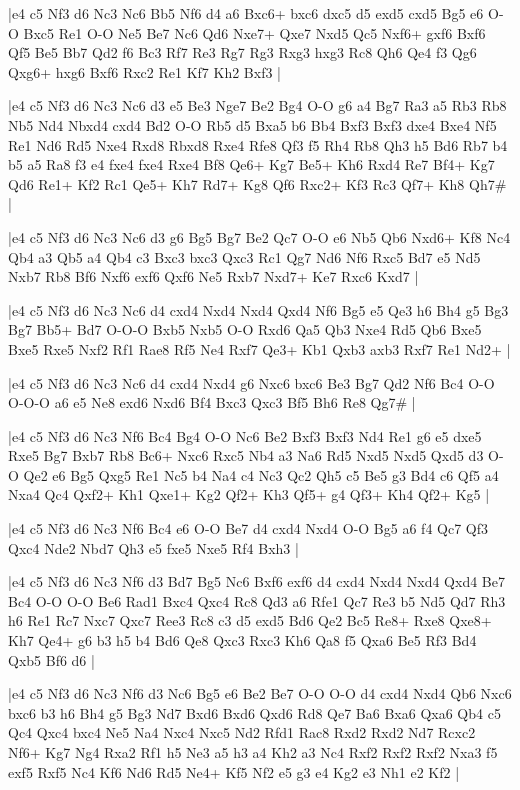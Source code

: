 \whitename{}
\blackname{}
\makegametitle
|e4 c5 Nf3 d6 Nc3 Nc6 Bb5 Nf6 d4 a6 Bxc6+ bxc6 dxc5 d5 exd5 cxd5 Bg5 e6 O-O Bxc5 Re1 O-O Ne5 Be7 Nc6 Qd6 Nxe7+ Qxe7 Nxd5 Qc5 Nxf6+ gxf6 Bxf6 Qf5 Be5 Bb7 Qd2 f6 Bc3 Rf7 Re3 Rg7 Rg3 Rxg3 hxg3 Rc8 Qh6 Qe4 f3 Qg6 Qxg6+ hxg6 Bxf6 Rxc2 Re1 Kf7 Kh2 Bxf3  |

\whitename{}
\blackname{}
\makegametitle
|e4 c5 Nf3 d6 Nc3 Nc6 d3 e5 Be3 Nge7 Be2 Bg4 O-O g6 a4 Bg7 Ra3 a5 Rb3 Rb8 Nb5 Nd4 Nbxd4 cxd4 Bd2 O-O Rb5 d5 Bxa5 b6 Bb4 Bxf3 Bxf3 dxe4 Bxe4 Nf5 Re1 Nd6 Rd5 Nxe4 Rxd8 Rbxd8 Rxe4 Rfe8 Qf3 f5 Rh4 Rb8 Qh3 h5 Bd6 Rb7 b4 b5 a5 Ra8 f3 e4 fxe4 fxe4 Rxe4 Bf8 Qe6+ Kg7 Be5+ Kh6 Rxd4 Re7 Bf4+ Kg7 Qd6 Re1+ Kf2 Rc1 Qe5+ Kh7 Rd7+ Kg8 Qf6 Rxc2+ Kf3 Rc3 Qf7+ Kh8 Qh7\#  |

\whitename{}
\blackname{}
\makegametitle
|e4 c5 Nf3 d6 Nc3 Nc6 d3 g6 Bg5 Bg7 Be2 Qc7 O-O e6 Nb5 Qb6 Nxd6+ Kf8 Nc4 Qb4 a3 Qb5 a4 Qb4 c3 Bxc3 bxc3 Qxc3 Rc1 Qg7 Nd6 Nf6 Rxc5 Bd7 e5 Nd5 Nxb7 Rb8 Bf6 Nxf6 exf6 Qxf6 Ne5 Rxb7 Nxd7+ Ke7 Rxc6 Kxd7  |

\whitename{}
\blackname{}
\makegametitle
|e4 c5 Nf3 d6 Nc3 Nc6 d4 cxd4 Nxd4 Nxd4 Qxd4 Nf6 Bg5 e5 Qe3 h6 Bh4 g5 Bg3 Bg7 Bb5+ Bd7 O-O-O Bxb5 Nxb5 O-O Rxd6 Qa5 Qb3 Nxe4 Rd5 Qb6 Bxe5 Bxe5 Rxe5 Nxf2 Rf1 Rae8 Rf5 Ne4 Rxf7 Qe3+ Kb1 Qxb3 axb3 Rxf7 Re1 Nd2+  |

\whitename{}
\blackname{}
\makegametitle
|e4 c5 Nf3 d6 Nc3 Nc6 d4 cxd4 Nxd4 g6 Nxc6 bxc6 Be3 Bg7 Qd2 Nf6 Bc4 O-O O-O-O a6 e5 Ne8 exd6 Nxd6 Bf4 Bxc3 Qxc3 Bf5 Bh6 Re8 Qg7\#  |

\whitename{}
\blackname{}
\makegametitle
|e4 c5 Nf3 d6 Nc3 Nf6 Bc4 Bg4 O-O Nc6 Be2 Bxf3 Bxf3 Nd4 Re1 g6 e5 dxe5 Rxe5 Bg7 Bxb7 Rb8 Bc6+ Nxc6 Rxc5 Nb4 a3 Na6 Rd5 Nxd5 Nxd5 Qxd5 d3 O-O Qe2 e6 Bg5 Qxg5 Re1 Nc5 b4 Na4 c4 Nc3 Qc2 Qh5 c5 Be5 g3 Bd4 c6 Qf5 a4 Nxa4 Qc4 Qxf2+ Kh1 Qxe1+ Kg2 Qf2+ Kh3 Qf5+ g4 Qf3+ Kh4 Qf2+ Kg5  |

\whitename{}
\blackname{}
\makegametitle
|e4 c5 Nf3 d6 Nc3 Nf6 Bc4 e6 O-O Be7 d4 cxd4 Nxd4 O-O Bg5 a6 f4 Qc7 Qf3 Qxc4 Nde2 Nbd7 Qh3 e5 fxe5 Nxe5 Rf4 Bxh3  |

\whitename{}
\blackname{}
\makegametitle
|e4 c5 Nf3 d6 Nc3 Nf6 d3 Bd7 Bg5 Nc6 Bxf6 exf6 d4 cxd4 Nxd4 Nxd4 Qxd4 Be7 Bc4 O-O O-O Be6 Rad1 Bxc4 Qxc4 Rc8 Qd3 a6 Rfe1 Qc7 Re3 b5 Nd5 Qd7 Rh3 h6 Re1 Rc7 Nxc7 Qxc7 Ree3 Rc8 c3 d5 exd5 Bd6 Qe2 Bc5 Re8+ Rxe8 Qxe8+ Kh7 Qe4+ g6 b3 h5 b4 Bd6 Qe8 Qxc3 Rxc3 Kh6 Qa8 f5 Qxa6 Be5 Rf3 Bd4 Qxb5 Bf6 d6  |

\whitename{}
\blackname{}
\makegametitle
|e4 c5 Nf3 d6 Nc3 Nf6 d3 Nc6 Bg5 e6 Be2 Be7 O-O O-O d4 cxd4 Nxd4 Qb6 Nxc6 bxc6 b3 h6 Bh4 g5 Bg3 Nd7 Bxd6 Bxd6 Qxd6 Rd8 Qe7 Ba6 Bxa6 Qxa6 Qb4 c5 Qc4 Qxc4 bxc4 Ne5 Na4 Nxc4 Nxc5 Nd2 Rfd1 Rac8 Rxd2 Rxd2 Nd7 Rcxc2 Nf6+ Kg7 Ng4 Rxa2 Rf1 h5 Ne3 a5 h3 a4 Kh2 a3 Nc4 Rxf2 Rxf2 Rxf2 Nxa3 f5 exf5 Rxf5 Nc4 Kf6 Nd6 Rd5 Ne4+ Kf5 Nf2 e5 g3 e4 Kg2 e3 Nh1 e2 Kf2  |

